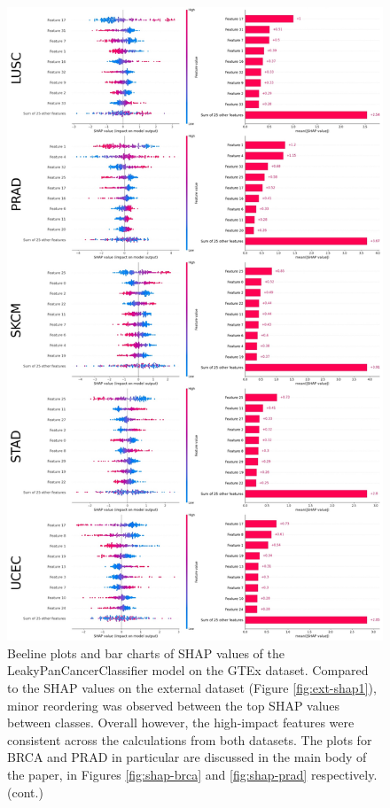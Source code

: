 \documentclass{l4proj}
\begin{document}
\begin{appendices}
\begin{figure}\ContinuedFloat
    \centering
    \includegraphics[width=0.85\linewidth]{images/gtex_shap2.jpg}
    \caption{Beeline plots and bar charts of SHAP values of the LeakyPanCancerClassifier model on the GTEx dataset. Compared to the SHAP values on the external dataset (Figure \ref{fig:ext-shap1}), minor reordering was observed between the top SHAP values between classes. Overall however, the high-impact features were consistent across the calculations from both datasets. The plots for BRCA and PRAD in particular are discussed in the main body of the paper, in Figures \ref{fig:shap-brca} and \ref{fig:shap-prad} respectively. (cont.)}
    \label{fig:gtex-shap2}
\end{figure}


\end{appendices}
\end{document}
